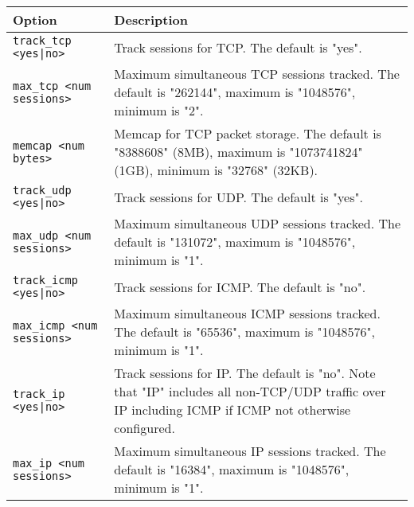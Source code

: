 \documentclass[english]{report}
\begin{document}
\begin{center}
\begin{tabular}{| l | p{4.5in} |}

\hline
\textbf{Option} & \textbf{Description}\\
\hline 

\hline 
\texttt{track\_tcp <yes|no>} &

Track sessions for TCP.  The default is "yes".\\

\hline
\texttt{max\_tcp <num sessions>} &

Maximum simultaneous TCP sessions tracked.  The default is "262144", maximum is
"1048576", minimum is "2".\\

\hline
\texttt{memcap <num bytes>} &

Memcap for TCP packet storage.  The default is "8388608" (8MB), maximum is
"1073741824" (1GB), minimum is "32768" (32KB).\\

\hline
\texttt{track\_udp <yes|no>} &

Track sessions for UDP.  The default is "yes".\\

\hline
\texttt{max\_udp <num sessions>} &

Maximum simultaneous UDP sessions tracked.  The default is "131072", maximum is
"1048576", minimum is "1".\\

\hline
\texttt{track\_icmp <yes|no>} &

Track sessions for ICMP.  The default is "no".\\

\hline
\texttt{max\_icmp <num sessions>} &

Maximum simultaneous ICMP sessions tracked.  The default is "65536", maximum is
"1048576", minimum is "1".\\

\hline
\texttt{track\_ip <yes|no>} &

Track sessions for IP.  The default is "no".  Note that "IP" includes all
non-TCP/UDP traffic over IP including ICMP if ICMP not otherwise configured.\\

\hline
\texttt{max\_ip <num sessions>} &

Maximum simultaneous IP sessions tracked.  The default is "16384", maximum is
"1048576", minimum is "1".\\


\end{tabular}
\end{center}
\end{document}
